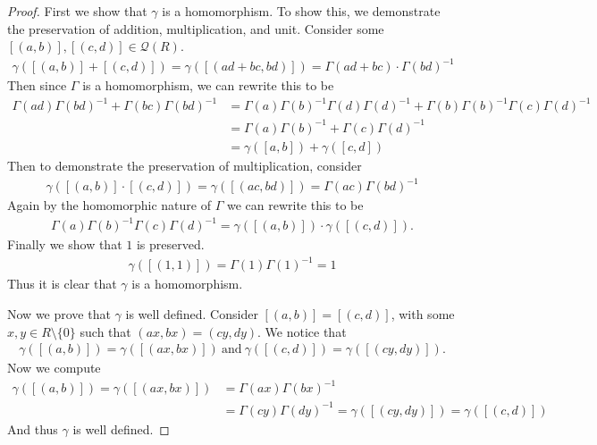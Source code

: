 \documentclass[10pt]{amsart}
\newcommand{\ra}{\rightarrow}
\newenvironment{claim}[1]{\par\noindent\textit{Claim:}\space#1}{}
\begin{document}
\begin{proof}
  First we show that $\gamma$ is a homomorphism. To show this, we demonstrate
  the preservation of addition, multiplication, and unit. Consider some
  $[(a,b)],[(c,d)]\in\mathcal{Q}(R)$.
  \begin{align*}
    \gamma([(a,b)]+[(c,d)])=\gamma([(ad+bc,bd)])=\Gamma(ad+bc)\cdot{\Gamma(bd)}^{-1}
  \end{align*}
  Then since $\Gamma$ is a homomorphism, we can rewrite this to be
  \begin{align*}
    \Gamma(ad){\Gamma(bd)}^{-1}+\Gamma(bc){\Gamma(bd)}^{-1}&=
    \Gamma(a){\Gamma(b)}^{-1}\Gamma(d){\Gamma(d)}^{-1} +
    \Gamma(b){\Gamma(b)}^{-1}\Gamma(c){\Gamma(d)}^{-1}\\
    &=\Gamma(a){\Gamma(b)}^{-1}+\Gamma(c){\Gamma(d)}^{-1}\\
    &=\gamma([a,b])+\gamma([c,d])
  \end{align*}
  Then to demonstrate the preservation of multiplication, consider
  \begin{align*}
    \gamma([(a,b)]\cdot[(c,d)])=\gamma([(ac,bd)])=\Gamma(ac){\Gamma(bd)}^{-1}
  \end{align*}
  Again by the homomorphic nature of $\Gamma$ we can rewrite this to be
  \begin{align*}
    \Gamma(a){\Gamma(b)}^{-1}\Gamma(c){\Gamma(d)}^{-1}=\gamma([(a,b)])\cdot\gamma([(c,d)]).
  \end{align*}
  Finally we show that $1$ is preserved.
  \begin{align*}
    \gamma([(1,1)])=\Gamma(1){\Gamma(1)}^{-1}=1
  \end{align*}
  Thus it is clear that $\gamma$ is a homomorphism.

  Now we prove that $\gamma$ is well defined. Consider $[(a,b)]=[(c,d)]$, with
  some $x,y\in R\setminus\{0\}$ such that $(ax,bx)=(cy,dy)$. We notice that
  \begin{align*}
    \gamma([(a,b)])=\gamma([(ax,bx)])\ \text{and}\
    \gamma([(c,d)])=\gamma([(cy,dy)]).
  \end{align*}
  Now we compute
  \begin{align*}
    \gamma([(a,b)])=\gamma([(ax,bx)])&=\Gamma(ax){\Gamma(bx)}^{-1}\\
    &=\Gamma(cy){\Gamma(dy)}^{-1}=\gamma([(cy,dy)])=\gamma([(c,d)])
  \end{align*}
  And thus $\gamma$ is well defined.
\end{proof}
\end{document}
